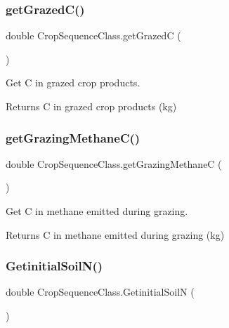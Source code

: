 \subsubsection{\texorpdfstring{getGrazedC()}{getGrazedC()}}
{\footnotesize\ttfamily double Crop\+Sequence\+Class.\+get\+GrazedC (\begin{DoxyParamCaption}{ }\end{DoxyParamCaption})\hspace{0.3cm}{\ttfamily [inline]}}



Get C in grazed crop products. 

\begin{DoxyReturn}{Returns}
C in grazed crop products (kg) 
\end{DoxyReturn}
\mbox{\label{class_crop_sequence_class_ab4dd8d2bb35bc75f0f7e3d916251553f}} 
\subsubsection{\texorpdfstring{getGrazingMethaneC()}{getGrazingMethaneC()}}
{\footnotesize\ttfamily double Crop\+Sequence\+Class.\+get\+Grazing\+MethaneC (\begin{DoxyParamCaption}{ }\end{DoxyParamCaption})\hspace{0.3cm}{\ttfamily [inline]}}



Get C in methane emitted during grazing. 

\begin{DoxyReturn}{Returns}
C in methane emitted during grazing (kg) 
\end{DoxyReturn}
\mbox{\label{class_crop_sequence_class_a2855cea389afe7a231c99e8dda48bcbe}} 
\subsubsection{\texorpdfstring{GetinitialSoilN()}{GetinitialSoilN()}}
{\footnotesize\ttfamily double Crop\+Sequence\+Class.\+Getinitial\+SoilN (\begin{DoxyParamCaption}{ }\end{DoxyParamCaption})\hspace{0.3cm}{\ttfamily [inline]}}



